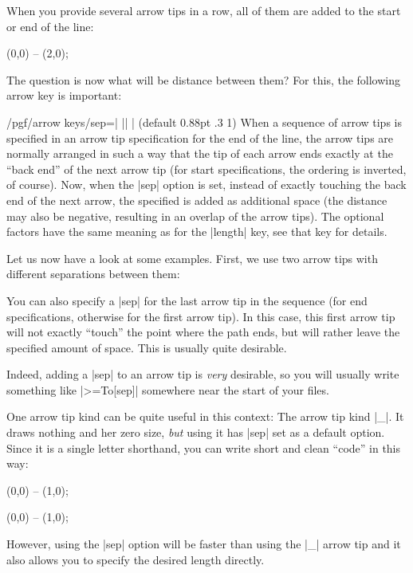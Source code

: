 When you provide several arrow tips in a row, all of them are added to
the start or end of the line:
\begin{codeexample}[]
\tikz \draw [<<<->>>>] (0,0) -- (2,0);
\end{codeexample}
The question is now what will be distance between them? For this, the
following arrow key is important:
\begin{key}{/pgf/arrow keys/sep=| || | (default 0.88pt .3 1)}
  When a sequence of arrow tips is specified in an arrow tip
  specification for the end of the line, the arrow tips are normally
  arranged in such a way that the tip of each arrow ends exactly at
  the ``back end'' of the next arrow tip (for start specifications,
  the ordering is inverted, of course). Now, when the |sep| option is
  set, instead of exactly touching the back end of the next arrow, the
  specified  is added as additional space (the
  distance may also be negative, resulting in an overlap of the arrow
  tips). The optional factors have the same meaning as for the
  |length| key, see that key for details.

  Let us now have a look at some examples. First, we use two arrow
  tips with different separations between them:
\begin{codeexample}[]
\end{codeexample}

  You can also specify a |sep| for the last arrow tip in the sequence
  (for end specifications, otherwise for the first arrow tip). In this
  case, this first arrow tip will not exactly ``touch'' the point
  where the path ends, but will rather leave the specified amount of
  space. This is usually quite desirable.
\begin{codeexample}[]
\end{codeexample}
  Indeed, adding a |sep| to an arrow tip is \emph{very} desirable, so
  you will usually write something like |>={To[sep]}| somewhere near
  the start of your files.

  One arrow tip kind can be quite useful in this context: The arrow
  tip kind |_|. It draws nothing and her zero size, \emph{but} using
  it has |sep| set as a default option. Since it is a single letter
  shorthand, you can write short and clean ``code'' in this way:
\begin{codeexample}[]  
\tikz \draw [->_>] (0,0) -- (1,0);
\end{codeexample}
\begin{codeexample}[]  
\tikz \draw [->__>] (0,0) -- (1,0);
\end{codeexample}
  However, using the |sep| option will be faster than using the |_|
  arrow tip and it also allows you to specify the desired length
  directly. 
\end{key}
